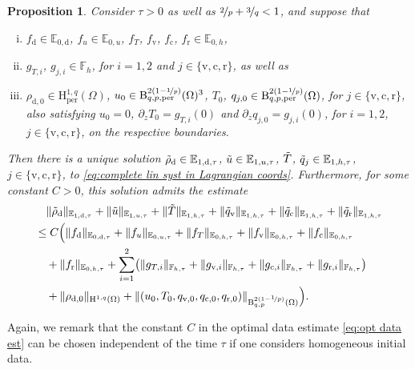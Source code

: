 \documentclass[10pt]{amsart}
\theoremstyle{plain}
\newtheorem{prop}[prop]{Proposition}
\theoremstyle{definition}
\theoremstyle{thm}
\numberwithin{equation}{section}
\newcommand{\rH}{\mathrm{H}}
\newcommand{\rB}{\mathrm{B}}
\newcommand{\E}{\mathbb{E}}
\newcommand{\F}{\mathbb{F}}
\newcommand{\del}{\partial}
\newcommand{\per}{\mathrm{per}}
\newcommand{\dz}{\del_z}
\newcommand{\rd}{\mathrm{d}}
\newcommand{\rr}{\mathrm{r}}
\newcommand{\rv}{\mathrm{v}}
\newcommand{\rc}{\mathrm{c}}
\newcommand{\trho}{\Tilde{\rho}}
\newcommand{\tu}{\Tilde{u}}
\newcommand{\tT}{\Tilde{T}}
\newcommand{\tq}{\Tilde{q}}
\begin{document}
\begin{prop}\label{prop:opt data result moisture compre NSE}
Consider $\tau > 0$ as well as $\nicefrac{2}{p}+ \nicefrac{3}{q}<1$, and suppose that 
\begin{enumerate}[(i)]
    \item $f_\rd \in \E_{0,\rd}$, $f_u \in \E_{0,u}$, $f_T$, $f_\rv$, $f_\rc$, $f_\rr \in \E_{0,h}$,
    \item $g_{T,i}$, $g_{j,i} \in \F_h$, for $i=1,2$ and $j \in \{\rv,\rc,\rr\}$, as well as
    \item $\rho_{\rd,0} \in \rH_\per^{1,q}(\Omega)$, $u_0 \in \rB_{q,p,\per}^{2(1-\nicefrac{1}{p})}(\Omega)^3$, $T_0$, $q_{j,0} \in \rB_{q,p,\per}^{2(1-\nicefrac{1}{p})}(\Omega)$, for $j \in \{\rv,\rc,\rr\}$, also satisfying $u_0 = 0$, $\dz T_0 = g_{T,i}(0)$ and $\dz q_{j,0} = g_{j,i}(0)$, for $i=1,2$, $j \in \{\rv,\rc,\rr\}$, on the respective boundaries.
\end{enumerate}
Then there is a unique solution $\trho_\rd \in \E_{1,\rd,\tau}$, $\tu \in \E_{1,u,\tau}$, $\tT$, $\tq_j \in \E_{1,h,\tau}$, $j \in \{\rv,\rc,\rr\}$, to \eqref{eq:complete lin syst in Lagrangian coords}.
Furthermore, for some constant $C > 0$, this solution admits the estimate
\begin{equation}\label{eq:opt data est}
    \begin{aligned}
        &\quad \| \trho_\rd \|_{\E_{1,\rd,\tau}} + \| \tu \|_{\E_{1,u,\tau}} + \| \tT \|_{\E_{1,h,\tau}} + \| \tq_\rv \|_{\E_{1,h,\tau}} + \| \tq_\rc \|_{\E_{1,h,\tau}} + \| \tq_\rr \|_{\E_{1,h,\tau}}\\
        &\le C\Bigl(\| f_\rd \|_{\E_{0,\rd,\tau}} + \| f_u \|_{\E_{0,u,\tau}} + \| f_T \|_{\E_{0,h,\tau}} + \| f_\rv \|_{\E_{0,h,\tau}} + \| f_\rc \|_{\E_{0,h,\tau}}\\
        &\quad + \| f_\rr \|_{\E_{0,h,\tau}} + \sum_{i=1}^2 \bigl ( \| g_{T,i} \|_{\F_{h,\tau}}+ \| g_{\rv,i} \|_{\F_{h,\tau}} + \| g_{\rc,i} \|_{\F_{h,\tau}} + \| g_{\rr,i} \|_{\F_{h,\tau}}\bigr)\\
        &\quad + \| \rho_{\rd,0} \|_{\rH^{1,q}(\Omega)} + \| (u_0,T_0,q_{\rv,0},q_{\rc,0},q_{\rr,0}) \|_{\rB_{q,p}^{2(1-\nicefrac{1}{p})}(\Omega)}\Bigr).
    \end{aligned}
\end{equation}
\end{prop}

Again, we remark that the constant $C$ in the optimal data estimate \eqref{eq:opt data est} can be chosen independent of the time $\tau$ if one considers homogeneous initial data.
\end{document}
